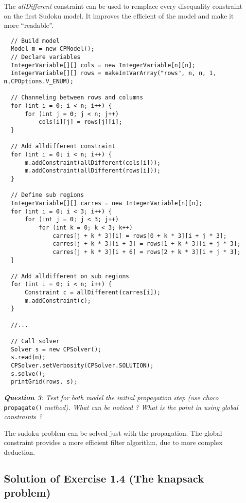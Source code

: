 The \emph{allDifferent} constraint can be used to remplace every disequality constraint on the first Sudoku model. It improves the efficient of the model and make it more ``readable''.

\begin{lstlisting}
  // Build model
  Model m = new CPModel();
  // Declare variables
  IntegerVariable[][] cols = new IntegerVariable[n][n];
  IntegerVariable[][] rows = makeIntVarArray("rows", n, n, 1, n,CPOptions.V_ENUM);
  
  // Channeling between rows and columns
  for (int i = 0; i < n; i++) {
      for (int j = 0; j < n; j++)
          cols[i][j] = rows[j][i];
  }
	
  // Add alldifferent constraint
  for (int i = 0; i < n; i++) {
      m.addConstraint(allDifferent(cols[i]));
      m.addConstraint(allDifferent(rows[i]));
  }

  // Define sub regions
  IntegerVariable[][] carres = new IntegerVariable[n][n];
  for (int i = 0; i < 3; i++) {
      for (int j = 0; j < 3; j++)
          for (int k = 0; k < 3; k++)
              carres[j + k * 3][i] = rows[0 + k * 3][i + j * 3];
              carres[j + k * 3][i + 3] = rows[1 + k * 3][i + j * 3];
              carres[j + k * 3][i + 6] = rows[2 + k * 3][i + j * 3];
  }
	
  // Add alldifferent on sub regions
  for (int i = 0; i < n; i++) {
      Constraint c = allDifferent(carres[i]);
      m.addConstraint(c);
  }
  
  //...
	
  // Call solver
  Solver s = new CPSolver();
  s.read(m);
  CPSolver.setVerbosity(CPSolver.SOLUTION);
  s.solve();
  printGrid(rows, s);
\end{lstlisting} 

\noindent\emph{\textbf{Question 3}: Test for both model the initial propagation step (use choco} \texttt{propagate()} \emph{method). What can be noticed ? What is the point in using global constraints ?}

The sudoku problem can be solved just with the propagation. 
The global constraint provides a more efficient filter algorithm, due to more complex deduction.

\subsection{Solution of Exercise 1.4 (The knapsack problem)}\label{solutions:solutionofexercise1.4}\hypertarget{solutions:solutionofexercise1.4}{}

